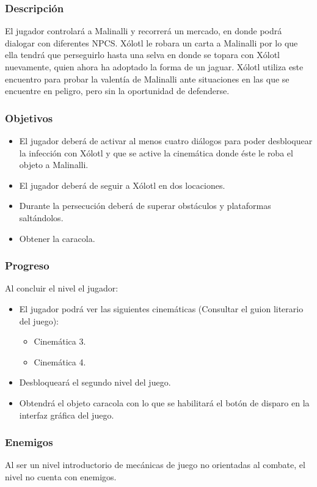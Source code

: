 \documentclass[11pt,letterpaper]{article}
\begin{document}
	\subsubsection{Descripción}
El jugador controlará a Malinalli y recorrerá un mercado, en donde podrá dialogar con diferentes NPCS. Xólotl le robara un carta a Malinalli por lo que ella tendrá que perseguirlo hasta una selva en donde se topara con Xólotl nuevamente, quien ahora ha adoptado la forma de un jaguar. Xólotl utiliza este encuentro para probar la valentía de Malinalli ante situaciones en las que se encuentre en peligro, pero sin la oportunidad de defenderse.    
	\subsubsection{Objetivos}
\begin{itemize}
	\item El jugador deberá de activar al menos cuatro diálogos para poder desbloquear la infección con Xólotl y que se active la cinemática donde éste le roba el objeto a Malinalli.
	\item El jugador deberá de seguir a Xólotl en dos locaciones. 
	\item Durante la persecución deberá de superar obstáculos y plataformas saltándolos.
	\item Obtener la caracola.
\end{itemize}
	\subsubsection{Progreso}
	Al concluir el nivel el jugador:
\begin{itemize}
	\item El jugador podrá ver las siguientes cinemáticas (Consultar el guion literario del juego):
	\begin{itemize}
		\item Cinemática 3.
		\item Cinemática 4.
	\end{itemize}
\item Desbloqueará el segundo nivel del juego.
\item Obtendrá el objeto caracola con lo que se habilitará el botón de disparo en la interfaz gráfica del juego.
\end{itemize}
	\subsubsection{Enemigos}
Al ser un nivel introductorio de mecánicas de juego no orientadas al combate, el nivel no cuenta con enemigos.
\end{document}

